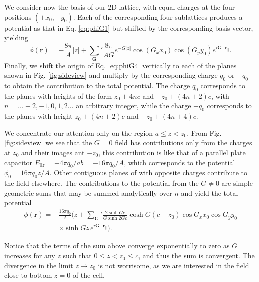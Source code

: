 \documentclass{article}
\newcommand{\abs}[1]{\lvert#1\rvert}
\begin{document}
We consider now the basis of our 2D lattice, with equal charges at the
four positions $(\pm x_0, \pm y_0)$. Each of the corresponding four
sublattices produces a potential as that in Eq. \eqref{eq:phiG1} but
shifted by the corresponding basis vector, yielding
\begin{equation}
  \label{eq:phiG4}
  \phi(\bm r) = -\frac{8\pi}{A} \abs{z}
    +{\sum_{\bm G}}' \frac{8\pi}{AG} e^{- G \abs{z}}\cos(G_x x_0)
    \cos(G_y y_0) e^{i \bm G\cdot\bm r_\|}.
\end{equation}
Finally, we shift the origin of Eq. \eqref{eq:phiG4} vertically to each of the planes shown in
Fig. \ref{fig:sideview} and multiply by the corresponding charge $q_0$
or $-q_0$ to obtain the contribution to the total potential. The charge $q_0$ corresponds to
the planes with heights of the form $z_0+4nc$ and $-z_0+(4n+2)c$, with
$n=\ldots-2,-1,0,1,2\ldots$ an arbitrary integer, while the charge
$-q_0$ corresponds to the planes with height $z_0+(4n+2)c$ and
$-z_0+(4n+4)c$.

We concentrate our attention only on the region $a\le z<z_0$. From
Fig. \ref{fig:sideview} we see that the $G=0$
field has contributions only from the charges at $z_0$ and their
images ant $-z_0$, this contribution is like that of a parallel plate
capacitor $E_{0z}=-4\pi q_0/ab=-16\pi q_0/A$, which corresponds to the
potential $\phi_0=16\pi q_0 z/A$. Other contiguous planes of with opposite charges
contribute to the field elsewhere. The contributions to the potential
from the $G\ne0$ are simple geometric sums that may be summed
analytically over $n$ and yield the total potential
\begin{equation}
  \label{eq:phitot}
  \begin{split}
    \phi(\bm r)=&\frac{16\pi q_0}{A}\biggl(z+{\sum_{\bm G}}'\frac{2\sinh
      Gc}{G \sinh 2Gc}\cosh G(c-z_0)\cos G_x x_0 \cos G_y y_0\\
    &\times \sinh Gz\, e^{i\bm G\cdot\bm r_\|}\biggr).
  \end{split}
\end{equation}

Notice that the terms of the sum above converge exponentially to zero
as $G$ increases for any $z$ such that $0\le z <z_0 \le c$, and thus
the sum is convergent. The divergence in the limit $ z
\longrightarrow z_0 $ is not worrisome, as we are interested in the
field close to bottom $z=0$ of the cell.
\end{document}
